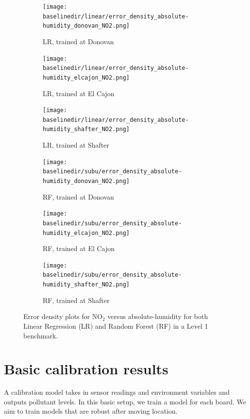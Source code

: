 \documentclass[journal abbreviation, manuscript]{copernicus}
\newcommand{\textus}[1]{$_{\text{#1}}$}
\begin{document}
\begin{figure}[H]
\centering
\begin{subfigure}{0.33\textwidth}
\texttt{[image: \\baselinedir/linear/error\_density\_absolute-humidity\_donovan\_NO2.png]}
\caption{LR, trained at Donovan}
\end{subfigure}
\begin{subfigure}{0.33\textwidth}
\texttt{[image: \\baselinedir/linear/error\_density\_absolute-humidity\_elcajon\_NO2.png]}
\caption{LR, trained at El Cajon}
\end{subfigure}
\begin{subfigure}{0.33\textwidth}
\texttt{[image: \\baselinedir/linear/error\_density\_absolute-humidity\_shafter\_NO2.png]}
\caption{LR, trained at Shafter}
\end{subfigure}
\begin{subfigure}{0.33\textwidth}
\texttt{[image: \\baselinedir/subu/error\_density\_absolute-humidity\_donovan\_NO2.png]}
\caption{RF, trained at Donovan}
\end{subfigure}
\begin{subfigure}{0.33\textwidth}
\texttt{[image: \\baselinedir/subu/error\_density\_absolute-humidity\_elcajon\_NO2.png]}
\caption{RF, trained at El Cajon}
\end{subfigure}
\begin{subfigure}{0.33\textwidth}
\texttt{[image: \\baselinedir/subu/error\_density\_absolute-humidity\_shafter\_NO2.png]}
\caption{RF, trained at Shafter}
\end{subfigure}
\caption{Error density plots for NO\textus{2} versus absolute-humidity for both Linear Regression (LR) and Random Forest (RF) in a Level 1 benchmark.}
\label{fig:error-density-NO2-temp}
\end{figure}

\iffalse
\section{Basic calibration results}

A calibration model takes in sensor readings and environment
variables and outputs pollutant levels. In this basic setup,
we train a model for each board.
We aim to train models that are robust after moving location.
\end{document}

